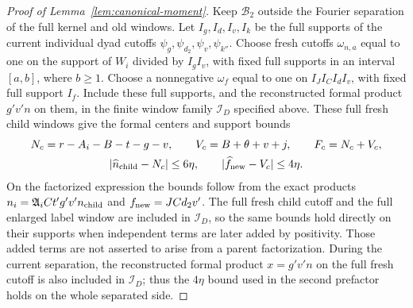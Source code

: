 \documentclass[11pt,a4paper]{article}
\numberwithin{equation}{section}
\numberwithin{figure}{section}
\theoremstyle{definition}
\theoremstyle{remark}
\begin{document}
\begin{proof}[Proof of Lemma~\ref{lem:canonical-moment}]
Keep \(\mathcal B_2\) outside the Fourier separation of the full kernel
and old windows. Let \(I_g,I_d,I_v,I_k\) be the full supports of the
current individual dyad cutoffs \(\psi_g,\psi_{d_2},\psi_v,\psi_{k''}\).
Choose fresh cutoffs \(\omega_{n,a}\) equal to one on the support of
\(W_i\) divided by \(I_gI_v\), with fixed full supports in an interval
\([a,b]\), where \(b\ge1\). Choose a nonnegative \(\omega_f\) equal to
one on \(I_JI_CI_dI_v\), with fixed full support \(I_f\). Include these
full supports, and the reconstructed formal product \(g'v'n\) on them,
in the finite window family \(\mathcal I_D\) specified above.
These full fresh child windows give the formal centers and support bounds
\begin{equation}\label{eq:canonical-child-lengths}
 \begin{gathered}
 N_c=r-A_i-B-t-g-v,\qquad V_c=B+\theta+v+j,\qquad F_c=N_c+V_c,\\
 |\widehat n_{\rm child}-N_c|\le6\eta,\qquad
 |\widehat f_{\rm new}-V_c|\le4\eta.
 \end{gathered}
\end{equation}
On the factorized expression the bounds follow from the exact products
\(n_i=\mathfrak A_iCt'g'v'n_{\rm child}\) and
\(f_{\rm new}=JCd_2v'\).  The full fresh child cutoff and the full enlarged
label window are included in \(\mathcal I_D\), so the same bounds hold
directly on their supports when independent terms are later added by
positivity.  Those added terms are not asserted to arise from a parent
factorization.  During the current separation, the reconstructed formal
product \(x=g'v'n\) on the full fresh cutoff is also included in
\(\mathcal I_D\); thus the \(4\eta\) bound used in the second prefactor
holds on the whole separated side.


\end{proof}
\end{document}
